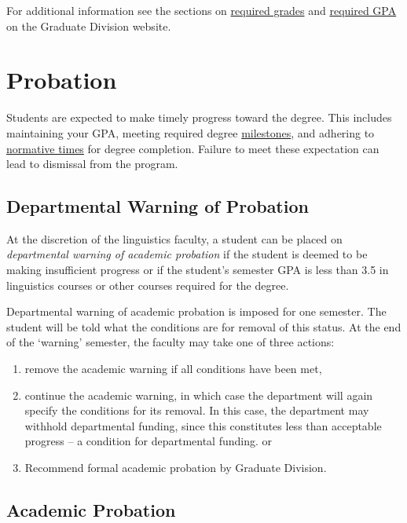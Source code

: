 \documentclass[
]{book}
\providecommand{\tightlist}{%
  \setlength{\itemsep}{0pt}\setlength{\parskip}{0pt}}
\begin{document}
For additional information see the sections on \href{https://manoa.hawaii.edu/graduate/required-grades/}{required grades} and \href{https://manoa.hawaii.edu/graduate/required-gdgpa/}{required GPA} on the Graduate Division website.

\section{Probation}\label{probation}

Students are expected to make timely progress toward the degree. This includes maintaining your GPA, meeting required degree \hyperref[phdprogram]{milestones}, and adhering to \hyperref[time]{normative times} for degree completion. Failure to meet these expectation can lead to dismissal from the program.

\subsection{Departmental Warning of Probation}\label{departmental-warning-of-probation}

At the discretion of the linguistics faculty, a student can be placed on \emph{departmental warning of academic probation} if the student is deemed to be making insufficient progress or if the student's semester GPA is less than 3.5 in linguistics courses or other courses required for the degree.

Departmental warning of academic probation is imposed for one semester. The student will be told what the conditions are for removal of this status. At the end of the `warning' semester, the faculty may take one of three actions:

\begin{enumerate}
\def\labelenumi{\arabic{enumi}.}
\tightlist
\item
  remove the academic warning if all conditions have been met,
\item
  continue the academic warning, in which case the department will again specify the conditions for its removal. In this case, the department may withhold departmental funding, since this constitutes less than acceptable progress -- a condition for departmental funding. or
\item
  Recommend formal academic probation by Graduate Division.
\end{enumerate}

\subsection{Academic Probation}\label{academic-probation}
\end{document}
